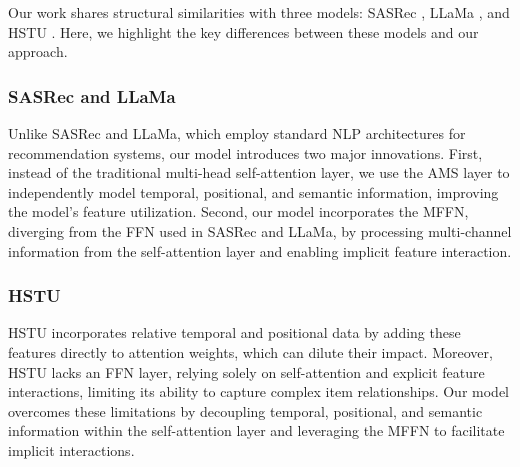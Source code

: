 Our work shares structural similarities with three models: SASRec \cite{kang2018self}, LLaMa \cite{dubey2024llama}, and HSTU \cite{zhai2024actions}. Here, we highlight the key differences between these models and our approach.

\subsubsection{SASRec and LLaMa} Unlike SASRec and LLaMa, which employ standard NLP architectures for recommendation systems, our model introduces two major innovations. First, instead of the traditional multi-head self-attention layer, we use the AMS layer to independently model temporal, positional, and semantic information, improving the model's feature utilization. Second, our model incorporates the MFFN, diverging from the FFN used in SASRec and LLaMa, by processing multi-channel information from the self-attention layer and enabling implicit feature interaction.

\subsubsection{HSTU} HSTU incorporates relative temporal and positional data by adding these features directly to attention weights, which can dilute their impact. Moreover, HSTU lacks an FFN layer, relying solely on self-attention and explicit feature interactions, limiting its ability to capture complex item relationships. Our model overcomes these limitations by decoupling temporal, positional, and semantic information within the self-attention layer and leveraging the MFFN to facilitate implicit interactions.


